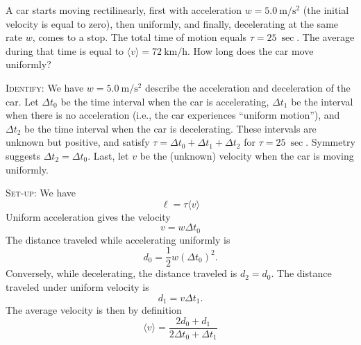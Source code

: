 

\begin{ex}
A car starts moving rectilinearly, first with acceleration
$w=\SI[per-mode=symbol]{5.0}{\meter\per\second\squared}$ (the initial
velocity is equal to zero), then uniformly, and finally, decelerating at
the same rate $w$, comes to a stop. The total time of motion equals
$\tau=\SI{25}{\sec}$. The average during that time is equal to $\langle
v\rangle=\SI[per-mode=symbol]{72}{\kilo\meter\per\hour}$. How long does
the car move uniformly?
\end{ex}
\begin{soln}
\textsc{Identify:} We have $w=\SI{5.0}{\meter\per\second\squared}$
describe the acceleration and deceleration of the car. Let $\Delta t_{0}$
be the time interval when the car is accelerating,
$\Delta t_{1}$ be the interval when there is no acceleration (i.e., the
car experiences ``uniform motion''), and $\Delta t_{2}$ be the time
interval when the car is decelerating. These intervals are unknown but
positive, and satisfy $\tau = \Delta t_{0} + \Delta t_{1} + \Delta t_{2}$
for $\tau=\SI{25}{\sec}$.
Symmetry suggests $\Delta t_{2}=\Delta t_{0}$. Last, let $v$ be the
(unknown) velocity when the car is moving uniformly.

\textsc{Set-up:}
We have
\begin{equation}
\ell = \tau \langle v\rangle
\end{equation}
Uniform acceleration gives the velocity
\begin{equation}
v = w\Delta t_{0}
\end{equation}
The distance traveled while accelerating uniformly is
\begin{equation}
d_{0} = \frac{1}{2}w(\Delta t_{0})^{2}.
\end{equation}
Conversely, while decelerating, the distance traveled is $d_{2}=d_{0}$.
The distance traveled under uniform velocity is
\begin{equation}
d_{1} = v\Delta t_{1}.
\end{equation}
The average velocity is then by definition
\begin{equation}\label{eq:ir1.3:def-avg-velocity}
\langle v\rangle = \frac{2d_{0} + d_{1}}{2\Delta t_{0} + \Delta t_{1}}
\end{equation}


\end{soln}
